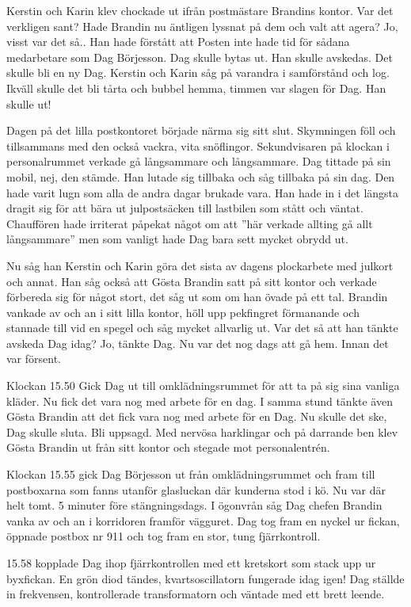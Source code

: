 Kerstin och Karin klev chockade ut ifrån postmästare Brandins kontor. Var det verkligen sant? Hade Brandin nu äntligen lyssnat på dem och valt att agera? Jo, visst var det så.. Han hade förstått att Posten inte hade tid för sådana medarbetare som Dag Börjesson. Dag skulle bytas ut. Han skulle avskedas. Det skulle bli en ny Dag. Kerstin och Karin såg på varandra i samförstånd och log. Ikväll skulle det bli tårta och bubbel hemma, timmen var slagen för Dag. Han skulle ut!   

Dagen på det lilla postkontoret började närma sig sitt slut. Skymningen föll och tillsammans med den också vackra, vita snöflingor. Sekundvisaren på klockan i personalrummet verkade gå långsammare och långsammare. Dag tittade på sin mobil, nej, den stämde. Han lutade sig tillbaka och såg tillbaka på sin dag. Den hade varit lugn som alla de andra dagar brukade vara. Han hade in i det längsta dragit sig för att bära ut julpostsäcken till lastbilen som stått och väntat. Chauffören hade irriterat påpekat något om att ”här verkade allting gå allt långsammare” men som vanligt hade Dag bara sett mycket obrydd ut. 

Nu såg han Kerstin och Karin göra det sista av dagens plockarbete med julkort och annat. Han såg också att Gösta Brandin satt på sitt kontor och verkade förbereda sig för något stort, det såg ut som om han övade på ett tal. Brandin vankade av och an i sitt lilla kontor, höll upp pekfingret förmanande och stannade till vid en spegel och såg mycket allvarlig ut. Var det så att han tänkte avskeda Dag idag? Jo, tänkte Dag. Nu var det nog dags att gå hem. Innan det var försent. 

Klockan 15.50 Gick Dag ut till omklädningsrummet för att ta på sig sina vanliga kläder. Nu fick det vara nog med arbete för en dag. I samma stund tänkte även Gösta Brandin att det fick vara nog med arbete för en Dag. Nu skulle det ske, Dag skulle sluta. Bli uppsagd. Med nervösa harklingar och på darrande ben klev Gösta Brandin ut från sitt kontor och stegade mot personalentrén. 

Klockan 15.55 gick Dag Börjesson ut från omklädningsrummet och fram till postboxarna som fanns utanför glasluckan där kunderna stod i kö. Nu var där helt tomt. 5 minuter före stängningsdags. I ögonvrån såg Dag chefen Brandin vanka av och an i korridoren framför vägguret. Dag tog fram en nyckel ur fickan, öppnade postbox nr 911 och tog fram en stor, tung fjärrkontroll. 

15.58 kopplade Dag ihop fjärrkontrollen med ett kretskort som stack upp ur byxfickan. En grön diod tändes, kvartsoscillatorn fungerade idag igen! Dag ställde in frekvensen, kontrollerade transformatorn och väntade med ett brett leende. 

